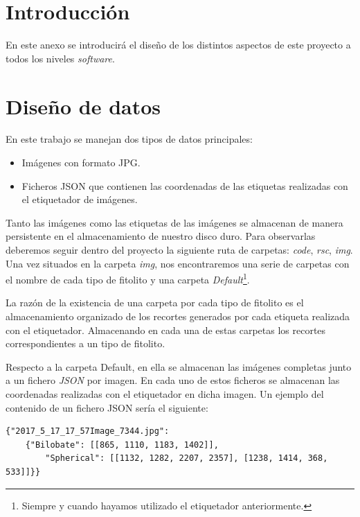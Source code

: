 
\section{Introducción}

En este anexo se introducirá el diseño de los distintos aspectos de este proyecto a todos los niveles \textit{software}.

\section{Diseño de datos}

En este trabajo se manejan dos tipos de datos principales:

\begin{itemize}
	\item Imágenes con formato JPG.
	\item Ficheros JSON que contienen las coordenadas de las etiquetas realizadas con el etiquetador de imágenes.
\end{itemize}

Tanto las imágenes como las etiquetas de las imágenes se almacenan de manera persistente en el almacenamiento de nuestro disco duro. Para observarlas deberemos seguir dentro del proyecto la siguiente ruta de carpetas: \textit{code}, \textit{rsc}, \textit{img}. Una vez situados en la carpeta \textit{img}, nos encontraremos una serie de carpetas con el nombre de cada tipo de fitolito y una carpeta \textit{Default}\footnote{Siempre y cuando hayamos utilizado el etiquetador anteriormente.}.%

La razón de la existencia de una carpeta por cada tipo de fitolito es el almacenamiento organizado de los recortes generados por cada etiqueta realizada con el etiquetador. Almacenando en cada una de estas carpetas los recortes correspondientes a un tipo de fitolito. 

Respecto a la carpeta Default, en ella se almacenan las imágenes completas junto a un fichero \textit{JSON} por imagen. En cada uno de estos ficheros se almacenan las coordenadas  realizadas con el etiquetador en dicha imagen. Un ejemplo del contenido de un fichero JSON sería el siguiente:

\begin{verbatim}
{"2017_5_17_17_57Image_7344.jpg": 
	{"Bilobate": [[865, 1110, 1183, 1402]], 
		"Spherical": [[1132, 1282, 2207, 2357], [1238, 1414, 368, 533]]}}
\end{verbatim}

